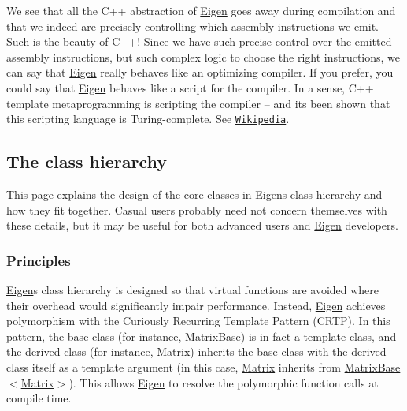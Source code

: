We see that all the C++ abstraction of \hyperlink{namespace_eigen}{Eigen} goes away during compilation and that we indeed are precisely controlling which assembly instructions we emit. Such is the beauty of C++! Since we have such precise control over the emitted assembly instructions, but such complex logic to choose the right instructions, we can say that \hyperlink{namespace_eigen}{Eigen} really behaves like an optimizing compiler. If you prefer, you could say that \hyperlink{namespace_eigen}{Eigen} behaves like a script for the compiler. In a sense, C++ template metaprogramming is scripting the compiler -- and it\textquotesingle{}s been shown that this scripting language is Turing-\/complete. See \href{http://en.wikipedia.org/wiki/Template_metaprogramming}{\tt Wikipedia}. \hypertarget{TopicClassHierarchy}{}\subsection{The class hierarchy}\label{TopicClassHierarchy}
This page explains the design of the core classes in \hyperlink{namespace_eigen}{Eigen}\textquotesingle{}s class hierarchy and how they fit together. Casual users probably need not concern themselves with these details, but it may be useful for both advanced users and \hyperlink{namespace_eigen}{Eigen} developers.\hypertarget{_topic_class_hierarchy_TopicClassHierarchyPrinciples}{}\subsubsection{Principles}\label{_topic_class_hierarchy_TopicClassHierarchyPrinciples}
\hyperlink{namespace_eigen}{Eigen}\textquotesingle{}s class hierarchy is designed so that virtual functions are avoided where their overhead would significantly impair performance. Instead, \hyperlink{namespace_eigen}{Eigen} achieves polymorphism with the Curiously Recurring Template Pattern (C\+R\+TP). In this pattern, the base class (for instance, {\ttfamily \hyperlink{group___core___module_class_eigen_1_1_matrix_base}{Matrix\+Base}}) is in fact a template class, and the derived class (for instance, {\ttfamily \hyperlink{group___core___module_class_eigen_1_1_matrix}{Matrix}}) inherits the base class with the derived class itself as a template argument (in this case, {\ttfamily \hyperlink{group___core___module_class_eigen_1_1_matrix}{Matrix}} inherits from {\ttfamily \hyperlink{group___core___module_class_eigen_1_1_matrix_base}{Matrix\+Base}$<$\hyperlink{group___core___module_class_eigen_1_1_matrix}{Matrix}$>$}). This allows \hyperlink{namespace_eigen}{Eigen} to resolve the polymorphic function calls at compile time.

